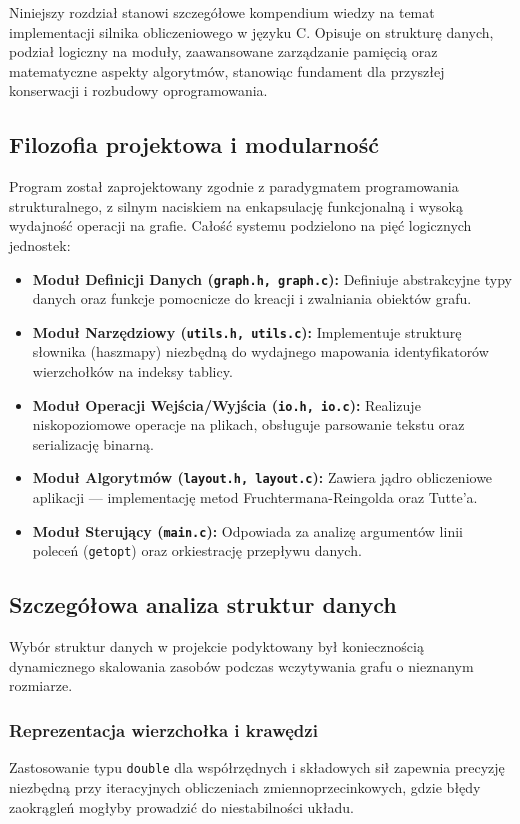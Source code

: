 \documentclass[12pt,a4paper]{article}
\begin{document}
Niniejszy rozdział stanowi szczegółowe kompendium wiedzy na temat implementacji silnika obliczeniowego w języku C. Opisuje on strukturę danych, podział logiczny na moduły, zaawansowane zarządzanie pamięcią oraz matematyczne aspekty algorytmów, stanowiąc fundament dla przyszłej konserwacji i rozbudowy oprogramowania.

\subsection{Filozofia projektowa i modularność}
Program został zaprojektowany zgodnie z paradygmatem programowania strukturalnego, z silnym naciskiem na enkapsulację funkcjonalną i wysoką wydajność operacji na grafie. Całość systemu podzielono na pięć logicznych jednostek:

\begin{itemize}
    \item \textbf{Moduł Definicji Danych (\texttt{graph.h, graph.c}):} Definiuje abstrakcyjne typy danych oraz funkcje pomocnicze do kreacji i zwalniania obiektów grafu.
    \item \textbf{Moduł Narzędziowy (\texttt{utils.h, utils.c}):} Implementuje strukturę słownika (haszmapy) niezbędną do wydajnego mapowania identyfikatorów wierzchołków na indeksy tablicy.
    \item \textbf{Moduł Operacji Wejścia/Wyjścia (\texttt{io.h, io.c}):} Realizuje niskopoziomowe operacje na plikach, obsługuje parsowanie tekstu oraz serializację binarną.
    \item \textbf{Moduł Algorytmów (\texttt{layout.h, layout.c}):} Zawiera jądro obliczeniowe aplikacji — implementację metod Fruchtermana-Reingolda oraz Tutte'a.
    \item \textbf{Moduł Sterujący (\texttt{main.c}):} Odpowiada za analizę argumentów linii poleceń (\texttt{getopt}) oraz orkiestrację przepływu danych.
\end{itemize}

\subsection{Szczegółowa analiza struktur danych}
Wybór struktur danych w projekcie podyktowany był koniecznością dynamicznego skalowania zasobów podczas wczytywania grafu o nieznanym rozmiarze.

\subsubsection{Reprezentacja wierzchołka i krawędzi}
Zastosowanie typu \texttt{double} dla współrzędnych i składowych sił zapewnia precyzję niezbędną przy iteracyjnych obliczeniach zmiennoprzecinkowych, gdzie błędy zaokrągleń mogłyby prowadzić do niestabilności układu.
\end{document}
